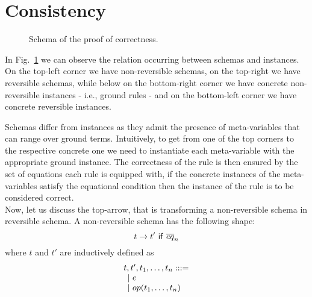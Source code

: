 \documentclass{article}[12pt,a4paper]
\theoremstyle{definition}
\begin{document}
\section{Consistency}

\begin{figure}
  \centering
  \caption{ Schema of the proof of correctness. }
  \label{fig:square}
\end{figure}

In Fig.~\ref{fig:square} we can observe the relation occurring between schemas
and instances. On the top-left corner we have non-reversible schemas, on the
top-right we have reversible schemas, while below on the
bottom-right corner we have concrete non-reversible instances - i.e., ground
rules - and on the bottom-left corner we have concrete reversible instances.

Schemas differ from instances as they admit the presence of meta-variables that
can range over ground terms. Intuitively, to get from one of the top corners to
the respective concrete one we need to instantiate each meta-variable with
the appropriate ground instance. The correctness of the rule is then ensured by
the set of equations each rule is equipped with, if the concrete instances of
the meta-variables satisfy the equational condition then the instance of the
rule is to be considered correct.\\

Now, let us discuss the top-arrow, that is transforming a non-reversible schema in reversible
schema. A non-reversible schema has the following shape:
\[t \rightarrow t'~\mathsf{if}~\overline{eq}_n\]
where $t$ and $t'$ are inductively defined as
\[
  \begin{array}{l}
    t,t',t_1,\ldots,t_n: ::=\\
    \hspace{1ex}|~e\\
    \hspace{1ex}|~op(t_1,\ldots,t_n)\\
  \end{array}
\]
\end{document}
